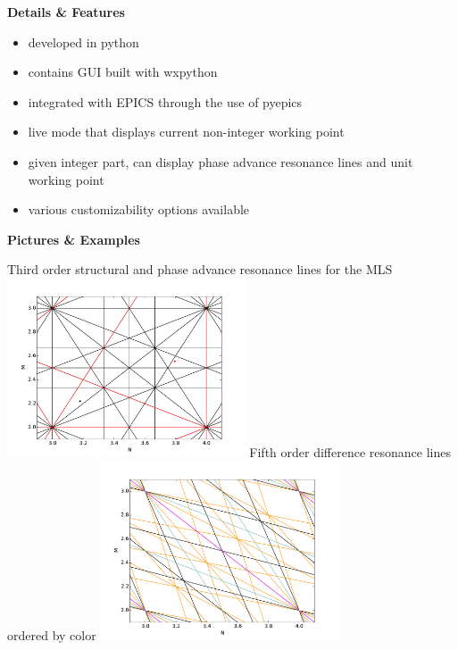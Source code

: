 \documentclass[
logosetup=topbar 
portrait,
a0paper%
]
{baposter}
\begin{document}
\begin{poster}
{
}

{
{\color{hzbblue}\bf\large Details \& Features}
\begin{itemize}

\item[\color{hzbblue}\textbullet] developed in python
\item[\color{hzbblue}\textbullet] contains GUI built with wxpython
\item[\color{hzbblue}\textbullet] integrated with EPICS through the use of pyepics
\item[\color{hzbblue}\textbullet] live mode that displays current non-integer working point
\item[\color{hzbblue}\textbullet] given integer part, can display phase advance resonance lines and unit working point
\item[\color{hzbblue}\textbullet] various customizability options available

\end{itemize}
{\color{hzbblue}\bf\large Pictures \& Examples}
\begin{center}
\large Third order structural and phase advance resonance lines for the MLS
\includegraphics[width=200pt]{Pics/image.pdf}
\large Fifth order difference resonance lines ordered by color
\includegraphics[width=200pt]{Pics/image2.pdf}
\end{center}

}
\end{poster}
\end{document}
